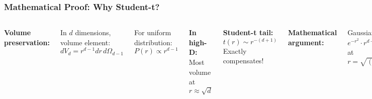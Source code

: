 \documentclass[aspectratio=169]{beamer}
\begin{document}
\begin{frame}
\frametitle{Mathematical Proof: Why Student-t?}
\begin{columns}[T]
\textbf{Volume preservation:}

In $d$ dimensions, volume element:
$$dV_d = r^{d-1} dr \, d\Omega_{d-1}$$

For uniform distribution:
$$P(r) \propto r^{d-1}$$

\vspace{0.2cm}
\textbf{In high-D:}\\
\small Most volume at $r \approx \sqrt{d}$

\vspace{0.2cm}
\textbf{Student-t tail:}
$$t(r) \sim r^{-(d+1)}$$
Exactly compensates!

\textbf{Mathematical argument:}

\small
Gaussian: $e^{-r^2} \cdot r^{d-1}$ peaks at $r = \sqrt{(d-1)/2}$

Student-t: $(1+r^2)^{-1} \cdot r$ is flatter

\vspace{0.3cm}
\textbf{Key ratio:}
$$\frac{q_{ij}}{q_{kl}} = \frac{1+\|\mathbf{y}_k-\mathbf{y}_l\|^2}{1+\|\mathbf{y}_i-\mathbf{y}_j\|^2}$$

Linear in squared distance!\\
(Gaussian is exponential)
\end{columns}
\end{frame}
\end{document}
